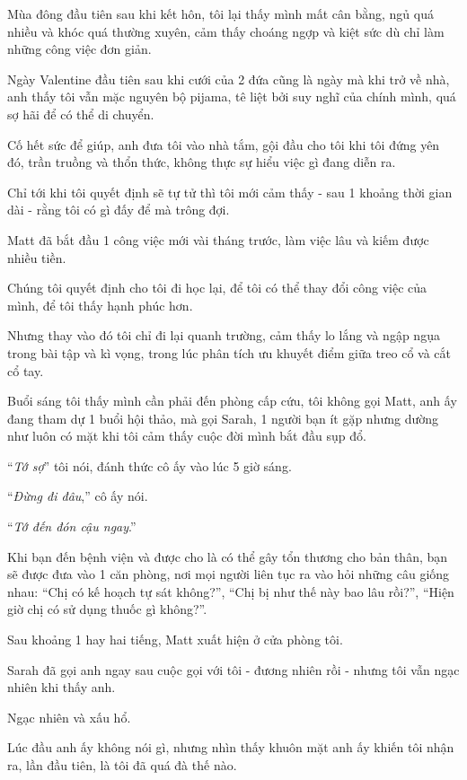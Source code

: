 \documentclass{article}
\begin{document}
Mùa đông đầu tiên sau khi kết hôn, tôi lại thấy mình mất cân bằng, ngủ quá nhiều và khóc quá thường xuyên, cảm thấy choáng ngợp và kiệt sức dù chỉ làm những công việc đơn giản.

%
Ngày Valentine đầu tiên sau khi cưới của 2 đứa cũng là ngày mà khi trở về nhà, anh thấy tôi vẫn mặc nguyên bộ pijama, tê liệt bởi suy nghĩ của chính mình, quá sợ hãi để có thể di chuyển.

Cố hết sức để giúp, anh đưa tôi vào nhà tắm, gội đầu cho tôi khi tôi đứng yên đó, trần truồng và thổn thức, không thực sự hiểu việc gì đang diễn ra.

Chỉ tới khi tôi quyết định sẽ tự tử thì tôi mới cảm thấy - sau 1 khoảng thời gian dài - rằng tôi có gì đấy để mà trông đợi.

Matt đã bắt đầu 1 công việc mới vài tháng trước, làm việc lâu và kiếm được nhiều tiền.

Chúng tôi quyết định cho tôi đi học lại, để tôi có thể thay đổi công việc của mình, để tôi thấy hạnh phúc hơn.

Nhưng thay vào đó tôi chỉ đi lại quanh trường, cảm thấy lo lắng và ngập ngụa trong bài tập và kì vọng, trong lúc phân tích ưu khuyết điểm giữa treo cổ và cắt cổ tay.

%
Buổi sáng tôi thấy mình cần phải đến phòng cấp cứu, tôi không gọi Matt, anh ấy đang tham dự 1 buổi hội thảo, mà gọi Sarah, 1 người bạn ít gặp nhưng dường như luôn có mặt khi tôi cảm thấy cuộc đời mình bắt đầu sụp đổ.

%
``\textit{Tớ sợ}'' tôi nói, đánh thức cô ấy vào lúc 5 giờ sáng.

%
``\textit{Đừng đi đâu},'' cô ấy nói.

``\textit{Tớ đến đón cậu ngay}.''

%
Khi bạn đến bệnh viện và được cho là có thể gây tổn thương cho bản thân, bạn sẽ được đưa vào 1 căn phòng, nơi mọi người liên tục ra vào hỏi những câu giống nhau: “Chị có kế hoạch tự sát không?”, “Chị bị như thế này bao lâu rồi?”, “Hiện giờ chị có sử dụng thuốc gì không?”.

%
Sau khoảng 1 hay hai tiếng, Matt xuất hiện ở cửa phòng tôi.

Sarah đã gọi anh ngay sau cuộc gọi với tôi - đương nhiên rồi - nhưng tôi vẫn ngạc nhiên khi thấy anh.

Ngạc nhiên và xấu hổ.

%
Lúc đầu anh ấy không nói gì, nhưng nhìn thấy khuôn mặt anh ấy khiến tôi nhận ra, lần đầu tiên, là tôi đã quá đà thế nào.
\end{document}
